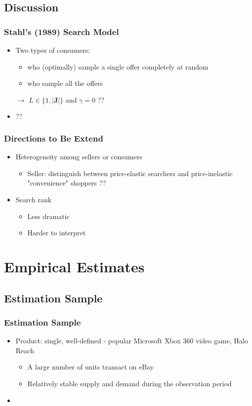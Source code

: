 \documentclass{beamer}
\begin{document}
\subsection{Discussion}
\begin{frame}
\frametitle{ Stahl's (1989) Search Model}
\begin{itemize}
\item Two types of consumers:
\begin{itemize}
\item who (optimally) sample a single offer completely at random
\item who sample all the offers
\end{itemize} 
          $\to$ $L \in \{1,|\mathbf{J}| \}$ and $\gamma=0$  ??
\item ??
\end{itemize}
\end{frame}

\begin{frame}
\frametitle{Directions to Be Extend}
\begin{itemize}
\item Heterogeneity among sellers or consumers
\begin{itemize}
\item Seller: distinguish between price-elastic searchers and price-inelastic "convenience" shoppers ??
\end{itemize}
\item Search rank
\begin{itemize}
\item Less dramatic
\item Harder to interpret
\end{itemize}
\end{itemize}
\end{frame}

\section{Empirical Estimates}
\subsection{Estimation Sample}
\begin{frame}
\frametitle{Estimation Sample}
\begin{itemize}
\item Product: single, well-defined - popular Microsoft Xbox 360 video game, Halo Reach
\begin{itemize}
\item A large number of units transact on eBay
\item Relatively stable supply and demand during the observation period
\end{itemize}
\item 
\end{itemize}
\end{frame}
\end{document}
